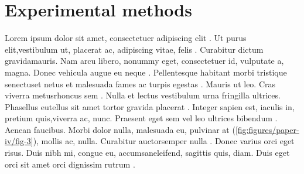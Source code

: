\chapter[Experimental methods]{Experimental methods}

\regularsection
\headerregularsection

\updatemylof %
\updatemylot %

\begin{sloppypar} %

Lorem  ipsum dolor sit amet, consectetuer adipiscing elit \cite{LIUDIMULYO201767}. Ut purus  elit,vestibulum ut, placerat ac, adipiscing vitae, felis . Curabitur dictum  gravidamauris. Nam arcu libero, nonummy eget, consectetuer id, vulputate a, magna. Donec vehicula augue eu neque \cite{liudimulyo_2018}. Pellentesque habitant morbi tristique senectuset netus et malesuada fames ac turpis egestas . Mauris ut leo. Cras viverra metusrhoncus sem \cite{2019liudimulyo}. Nulla et lectus vestibulum urna fringilla ultrices. Phasellus eutellus sit amet tortor gravida placerat . Integer sapien est, iaculis in, pretium quis,viverra ac, nunc. Praesent eget sem vel leo ultrices bibendum \cite{liudimulyo2020853}. Aenean faucibus. Morbi dolor nulla, malesuada eu, pulvinar at (\ref{fig:figures/paper-iv/fig-3}), mollis ac, nulla. Curabitur auctorsemper nulla . Donec varius orci eget risus. Duis nibh mi, congue eu, accumsaneleifend, sagittis quis, diam. Duis eget orci sit amet orci dignissim rutrum \cite{LIUDIMULYO201767,liudimulyo_2018,2019liudimulyo,liudimulyo2020853,liudimulyo_unpublished1,liudimulyo_unpublished2}.

\end{sloppypar}

